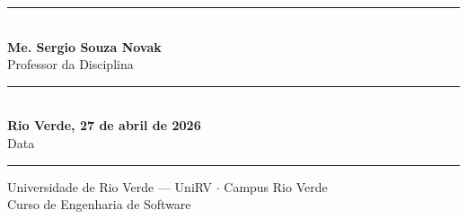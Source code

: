 \documentclass[a4paper,12pt]{article}
\begin{document}
\vspace{1.2cm}

\noindent
\begin{minipage}{0.48\textwidth}
    \centering
    \rule{6cm}{0.5pt}\\[4pt]
    \textbf{Me. Sergio Souza Novak}\\
    \small Professor da Disciplina
\end{minipage}
\hfill
\begin{minipage}{0.48\textwidth}
    \centering
    \rule{6cm}{0.5pt}\\[4pt]
    \textbf{Rio Verde, 27 de abril de 2026}\\
    \small Data
\end{minipage}

\vspace{1.5cm}
\noindent\rule{\linewidth}{1.5pt}

\begin{center}
    \small\color{gray}
    Universidade de Rio Verde --- UniRV $\cdot$ Campus Rio Verde\\
    Curso de Engenharia de Software
\end{center}
\end{document}
